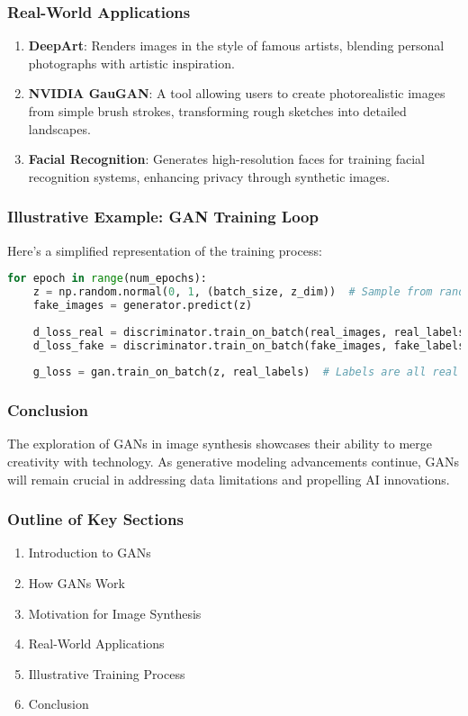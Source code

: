 \documentclass[aspectratio=169]{beamer}
\begin{document}
\begin{frame}
    \frametitle{Real-World Applications}
    \begin{enumerate}
        \item \textbf{DeepArt}: Renders images in the style of famous artists, blending personal photographs with artistic inspiration.
        \item \textbf{NVIDIA GauGAN}: A tool allowing users to create photorealistic images from simple brush strokes, transforming rough sketches into detailed landscapes.
        \item \textbf{Facial Recognition}: Generates high-resolution faces for training facial recognition systems, enhancing privacy through synthetic images.
    \end{enumerate}
\end{frame}

\begin{frame}[fragile]
    \frametitle{Illustrative Example: GAN Training Loop}
    Here’s a simplified representation of the training process:
    \begin{lstlisting}[language=Python]
for epoch in range(num_epochs):
    z = np.random.normal(0, 1, (batch_size, z_dim))  # Sample from random noise
    fake_images = generator.predict(z)
    
    d_loss_real = discriminator.train_on_batch(real_images, real_labels)
    d_loss_fake = discriminator.train_on_batch(fake_images, fake_labels)
    
    g_loss = gan.train_on_batch(z, real_labels)  # Labels are all real for the Generator
    \end{lstlisting}
\end{frame}

\begin{frame}
    \frametitle{Conclusion}
    The exploration of GANs in image synthesis showcases their ability to merge creativity with technology. As generative modeling advancements continue, GANs will remain crucial in addressing data limitations and propelling AI innovations.
\end{frame}

\begin{frame}
    \frametitle{Outline of Key Sections}
    \begin{enumerate}
        \item Introduction to GANs
        \item How GANs Work
        \item Motivation for Image Synthesis
        \item Real-World Applications
        \item Illustrative Training Process
        \item Conclusion
    \end{enumerate}
\end{frame}
\end{document}
